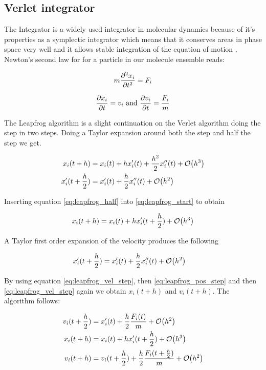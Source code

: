 \documentclass[11pt]{article}
\begin{document}
	\subsection{Verlet integrator}
		\label{sub:verlet}
		The Integrator is a widely used integrator in  molecular dynamics \cite{compPhys} because of it's properties as a symplectic integrator which means that it conserves areas in phase space very well and it allows stable integration of the equation of motion \cite{aBInitio}. Newton's second law for for a particle in our molecule ensemble reads:

		\[m\pdv[2]{x_{i}}{t} = F_{i}\]

		\[\pdv{x_{i}}{t} = v_{i} \text{     and     } \pdv{v_{i}}{t} = \frac{F_{i}}{m} \]

		The Leapfrog algorithm is a slight continuation on the Verlet algorithm doing the step in two steps. Doing a Taylor expansion around both the step and half the step we get.
	

		\begin{align}
			x_{i}(t+h) &= x_i(t) + hx_i'(t) + \frac{h^2}{2}x_i''(t) + \order{h^3} \label{eq:leapfrog_start}
			\\
			x_i'(t+ \frac{h}{2} ) &= x_i'(t) + \frac{h}{2} x_i''(t) + \order{h^2} \label{eq:leapfrog_half}
		\end{align}	

		\noindent Inserting equation \eqref{eq:leapfrog_half} into \eqref{eq:leapfrog_start} to obtain

		\begin{equation}
		x_{i}(t+h) = x_i(t) + hx_i'(t+ \frac{h}{2})+ \order{h^3} \label{eq:leapfrog_pos_step}
		\end{equation}

		\noindent A Taylor first order expansion of the velocity produces the following

		\begin{align}
			x'_i(t+\frac{h}{2}) &= x_i'(t)  + \frac{h}{2}x_i''(t) + \order{h^2} \label{eq:leapfrog_vel_step}
		\end{align}

		\noindent By using equation \eqref{eq:leapfrog_vel_step}, then \eqref{eq:leapfrog_pos_step} and then \eqref{eq:leapfrog_vel_step} again we obtain \(x_i(t+h)\) and \(v_i(t+h)\). The algorithm follows:

		\begin{align*}
		v_i(t+\frac{h}{2}) &= x_i'(t)  + \frac{h}{2}\frac{F_i(t)}{m} + \order{h^2} 
		\\
		x_i(t+h) &= x_i(t) + hx_i'(t+ \frac{h} {2} ) + \order{h ^ 3}
		\\
		v_i(t+h) &= v_i(t+\frac{h}{2})  +  \frac{h}{2}\frac{F_i(t+ \frac{h}{2})}{m} + \order{h^2} 
		\end{align*}
\end{document}
